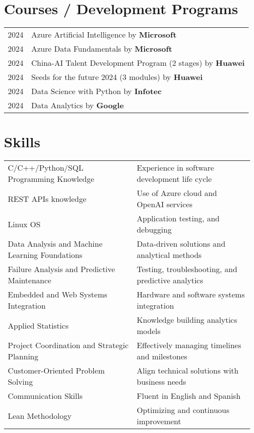 \documentclass[a4paper,12pt]{article}
\begin{document}
\section{Courses / Development Programs}
\begin{tabularx}{\linewidth}{@{}l X@{}}	
2024 & Azure Artificial Intelligence by \textbf{Microsoft} \hfill  \\

2024 & Azure Data Fundamentals by \textbf{Microsoft} \hfill \normalsize \\

2024 & China-AI Talent Development Program (2 stages) by \textbf{Huawei} \hfill \\ 

2024 & Seeds for the future 2024 (3 modules) by \textbf{Huawei} \hfill \\

2024 & Data Science with Python by \textbf{Infotec} \hfill \\

2024 & Data Analytics by \textbf{Google} \hfill \\
\end{tabularx}

\section{Skills}
\begin{tabularx}{\linewidth}{@{}l X@{}}
C/C++/Python/SQL Programming Knowledge &  \normalsize{Experience in software development life cycle}\\
REST APIs knowledge &  \normalsize{Use of Azure cloud and OpenAI services}\\
Linux OS &  \normalsize{Application testing, and debugging}\\
Data Analysis and Machine Learning Foundations  &  \normalsize{Data-driven solutions and analytical methods}\\  
Failure Analysis and Predictive Maintenance  &  \normalsize{Testing, troubleshooting, and predictive analytics}\\  
Embedded and Web Systems Integration  &  \normalsize{Hardware and software systems integration}\\  
Applied Statistics  &  \normalsize{Knowledge building analytics models}\\  
Project Coordination and Strategic Planning  &  \normalsize{Effectively managing timelines and milestones}\\    
Customer-Oriented Problem Solving  &  \normalsize{Align technical solutions with business needs}\\  
Communication Skills  &  \normalsize{Fluent in English and Spanish}\\  
Lean Methodology  &  \normalsize{Optimizing and continuous improvement}\\  
\end{tabularx}
\end{document}
